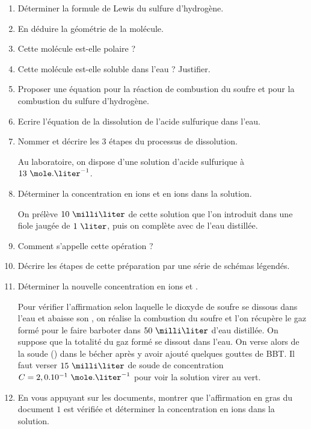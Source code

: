 \begin{enumerate}
\item Déterminer la formule de Lewis du sulfure d'hydrogène.
\item En déduire la géométrie de la molécule.
\item Cette molécule est-elle polaire ?
\item Cette molécule est-elle soluble dans l'eau ? Justifier.
\item Proposer une équation pour la réaction de combustion du soufre et pour la combustion du sulfure d'hydrogène.
\item Ecrire l'équation de la dissolution de l'acide sulfurique dans l'eau.
\item Nommer et décrire les $3$ étapes du processus de dissolution.

\vspace{0.3cm}

Au laboratoire, on dispose d'une solution d'acide sulfurique à $13\text{ }\mole.\liter^{-1}$.

\item Déterminer la concentration en ions  et en ions  dans la solution.

\vspace{0.3cm}

On prélève $10\text{ }\milli\liter$ de cette solution que l'on introduit dans une fiole jaugée de $1\text{ }\liter$, puis on complète avec de l'eau distillée.

\item Comment s'appelle cette opération ?

\item Décrire les étapes de cette préparation par une série de schémas légendés.

\item Déterminer la nouvelle concentration en ions  et .

\vspace{0.3cm}

Pour vérifier l'affirmation selon laquelle le dioxyde de soufre se dissous dans l'eau et abaisse son , on réalise la combustion du soufre et l'on récupère le gaz formé pour le faire barboter dans $50\text{ }\milli\liter$ d'eau distillée. On suppose que la totalité du gaz formé se dissout dans l'eau.\newline
On verse alors de la soude () dans le bécher après y avoir ajouté quelques gouttes de BBT. Il faut verser $15\text{ }\milli\liter$ de soude de concentration $C = 2,0 . 10^{-1}\text{ }\mole.\liter^{-1}$ pour voir la solution virer au vert.

\item En vous appuyant sur les documents, montrer que l'affirmation en gras du document $1$ est vérifiée et déterminer la concentration en ions  dans la solution.

\end{enumerate}


\newpage